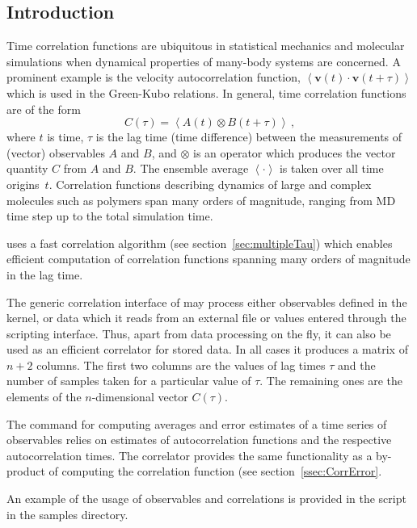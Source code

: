 \subsection{Introduction}
Time correlation functions are ubiquitous in statistical mechanics and molecular
simulations when dynamical properties of many-body systems are concerned.
A prominent example is the velocity autocorrelation function,  
$ \left< \mathbf{v}(t) \cdot \mathbf{v}(t+\tau) \right> $ 
which is used in the Green-Kubo relations.
In general, time correlation functions are of the form
\begin{equation}
C(\tau) = \left<A\left(t\right) \otimes B\left(t+\tau\right)\right>\,,
\label{eq:corr.def}
\end{equation}
where $t$ is time, $\tau$ is the lag time (time difference) between 
the measurements of (vector) observables $A$ and $B$, and $\otimes$ is an
operator which produces the vector quantity $C$ from $A$ and $B$. 
The ensemble average $\left< \cdot \right>$ is taken over all time origins~$t$. 
Correlation functions describing dynamics of large and complex molecules 
such as polymers span many orders of magnitude, ranging from MD time step
up to the total simulation time. 

\es uses a fast correlation algorithm (see section~\ref{sec:multipleTau})
which enables efficient computation of correlation functions spanning
many orders of magnitude in the lag time. 

The generic correlation interface of \es may process either observables
defined in the kernel, or data which it reads from an external file
or values entered through the scripting interface. 
Thus, apart from
data processing on the fly, it can also be used as an efficient correlator
for stored data. In all cases it produces a matrix of 
$n+2$ columns. The first two columns are the values of lag times $\tau$ and 
the number of samples taken for a particular value of $\tau$. The
remaining ones are the elements of the $n$-dimensional vector $C(\tau)$.

The  command for computing averages and error estimates 
of a time series of observables relies on estimates of autocorrelation
functions and the respective autocorrelation times.
The correlator provides the same functionality as a by-product of computing
the correlation function (see section~\ref{ssec:CorrError}.

An example of the usage of observables and correlations is provided 
in the script  in the samples directory.


